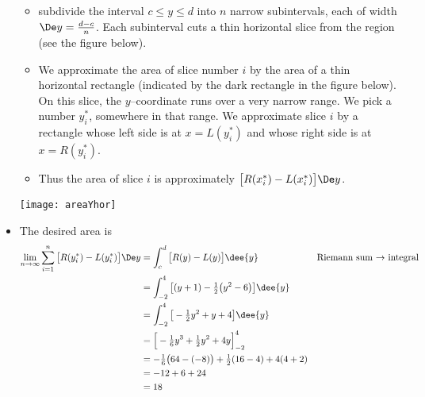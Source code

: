 \begin{eg}
\begin{itemize}
\begin{itemize}
 \item subdivide the interval $c\le y\le d$ into $n$ narrow subintervals, each of width
$\De y=\frac{d-c}{n}$. Each subinterval cuts a thin horizontal slice from the region (see
the figure below).
 \item We approximate the area of slice number $i$ by the area of a thin
horizontal rectangle (indicated by the dark rectangle in the figure below). On this
slice, the $y$--coordinate runs over a very narrow range.
We pick a number $y_i^*$, somewhere in that range. We approximate slice
$i$ by a rectangle whose left side is at $x=L(y_i^*)$ and whose right side
is at $x=R(y_i^*)$.
\item Thus the area of slice $i$ is approximately $\big[R(x_i^*)-L(x_i^*)\big]\De y$.
\end{itemize}
\begin{efig}
\begin{center}
   \texttt{[image: areaYhor]}
\end{center}
\end{efig}
\item The desired area is
\begin{align*}
\lim_{n\rightarrow\infty}\sum_{i=1}^n \big[R(y_i^*)-L(y_i^*)\big]\De y
&=\int_c^d \big[R(y)-L(y)\big]\dee{y} & \text{Riemann sum $\rightarrow$ integral}\\
&=\int_{-2}^4 \big[(y+1)-\tfrac{1}{2}\big(y^2-6\big)\big]\dee{y} \\
&=\int_{-2}^4 \big[-\tfrac{1}{2}y^2+y+4\big]\dee{y} \\
&=\Big[-\tfrac{1}{6}y^3+\tfrac{1}{2}y^2+4y\Big]_{-2}^4 \\
&=-\tfrac{1}{6}\big(64-(-8)\big)+\tfrac{1}{2}(16-4)+4(4+2)\\
&=-12+6+24 \\
&=18
\end{align*}
\end{itemize}

\end{eg}

